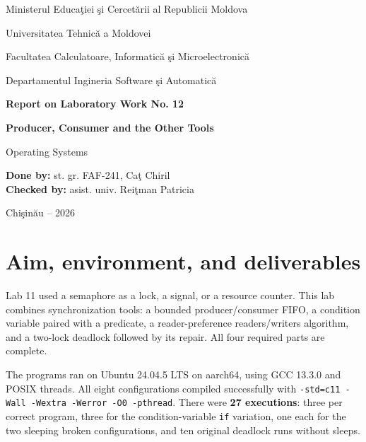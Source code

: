 \documentclass[12pt]{article}
\begin{document}
\begin{titlepage}
\centering
{\large Ministerul Educa\c{t}iei \c{s}i Cercet\u{a}rii al Republicii Moldova\par}
\vspace{0.45cm}
{\large Universitatea Tehnic\u{a} a Moldovei\par}
\vspace{0.45cm}
{\large Facultatea Calculatoare, Informatic\u{a} \c{s}i Microelectronic\u{a}\par}
\vspace{0.45cm}
{\large Departamentul Ingineria Software \c{s}i Automatic\u{a}\par}
\vspace{3cm}
{\Large\bfseries Report on Laboratory Work No. 12\par}
\vspace{0.55cm}
{\LARGE\bfseries Producer, Consumer and the Other Tools\par}
\vspace{0.35cm}
{\large Operating Systems\par}
\vfill
\begin{flushleft}
\textbf{Done by:} st. gr. FAF-241, Ca\c{t} Chiril\\[0.8cm]
\textbf{Checked by:} asist. univ. Rei\c{t}man Patricia
\end{flushleft}
\vfill
{Chi\c{s}in\u{a}u -- 2026\par}
\end{titlepage}
\tableofcontents
\clearpage
{}

\section{Aim, environment, and deliverables}
Lab 11 used a semaphore as a lock, a signal, or a resource counter.
This lab combines synchronization tools: a bounded producer/consumer FIFO,
a condition variable paired with a predicate, a reader-preference
readers/writers algorithm, and a two-lock deadlock followed by its repair.
All four required parts are complete.

The programs ran on Ubuntu 24.04.5 LTS on aarch64, using GCC 13.3.0 and
POSIX threads. All eight configurations compiled successfully with
\texttt{-std=c11 -Wall -Wextra -Werror -O0 -pthread}. There were
\textbf{27 executions}: three per correct program, three for the
condition-variable \texttt{if} variation, one each for the two sleeping
broken configurations, and ten original deadlock runs without sleeps.
\end{document}
